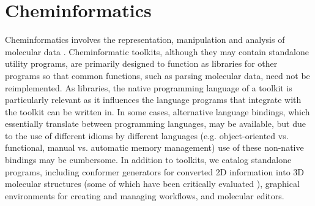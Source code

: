 \section{Cheminformatics}
 
Cheminformatics involves the representation, manipulation and analysis of molecular data \cite{Leach_2007,Gasteiger_2003}. Cheminformatic toolkits, although they may contain standalone utility programs, are primarily designed to function as libraries for other programs so that common functions, such as parsing molecular data, need not be reimplemented.  As libraries, the native programming language of a toolkit is particularly relevant as it influences the language programs that integrate with the toolkit can be written in.  In some cases, alternative language bindings, which essentially translate between programming languages, may be available, but due to the use of different idioms by different languages (e.g. object-oriented vs. functional, manual vs. automatic memory management) use of these non-native bindings may be cumbersome.  In addition to toolkits, we catalog standalone programs, including conformer generators for converted 2D information into 3D molecular structures (some of which have been critically evaluated \cite{Ebejer_2012}), graphical environments for creating and managing workflows, and molecular editors.